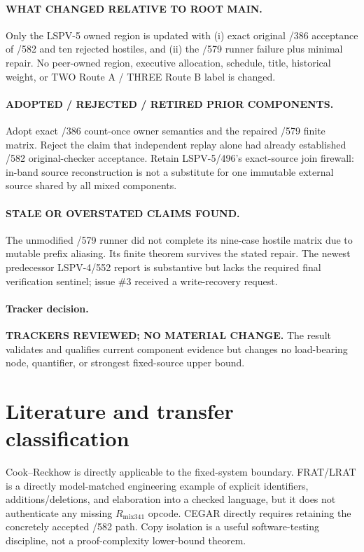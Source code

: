 \documentclass[11pt]{article}
\begin{document}
\paragraph{WHAT CHANGED RELATIVE TO ROOT MAIN.}
Only the LSPV-5 owned region is updated with (i) exact original /386 acceptance
of /582 and ten rejected hostiles, and (ii) the /579 runner failure plus minimal
repair.  No peer-owned region, executive allocation, schedule, title,
historical weight, or TWO Route A / THREE Route B label is changed.

\paragraph{ADOPTED / REJECTED / RETIRED PRIOR COMPONENTS.}
Adopt exact /386 count-once owner semantics and the repaired /579 finite
matrix.  Reject the claim that independent replay alone had already
established /582 original-checker acceptance.  Retain LSPV-5/496's
exact-source join firewall: in-band source reconstruction is not a substitute
for one immutable external source shared by all mixed components.

\paragraph{STALE OR OVERSTATED CLAIMS FOUND.}
The unmodified /579 runner did not complete its nine-case hostile matrix due
to mutable prefix aliasing.  Its finite theorem survives the stated repair.
The newest predecessor LSPV-4/552 report is substantive but lacks the required
final verification sentinel; issue \#3 received a write-recovery request.

\paragraph{Tracker decision.}
\textbf{TRACKERS REVIEWED; NO MATERIAL CHANGE.}
The result validates and qualifies current component evidence but changes no
load-bearing node, quantifier, or strongest fixed-source upper bound.

\section{Literature and transfer classification}
Cook--Reckhow is directly applicable to the fixed-system boundary.  FRAT/LRAT
is a directly model-matched engineering example of explicit identifiers,
additions/deletions, and elaboration into a checked language, but it does not
authenticate any missing \(R_{\mathrm{mix341}}\) opcode.  CEGAR directly
requires retaining the concretely accepted /582 path.  Copy isolation is a
useful software-testing discipline, not a proof-complexity lower-bound theorem.
\end{document}
